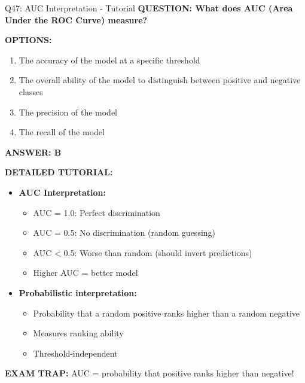 \documentclass[8pt]{beamer}
\begin{document}
	\begin{frame}{Q47: AUC Interpretation - Tutorial}
		\fontsize{6.5}{7.5}\selectfont
		\textbf{QUESTION: What does AUC (Area Under the ROC Curve) measure?}
		
		\vspace{0.1cm}
		\textbf{OPTIONS:}
		\begin{enumerate}
			\item The accuracy of the model at a specific threshold
			\item The overall ability of the model to distinguish between positive and negative classes
			\item The precision of the model
			\item The recall of the model
		\end{enumerate}
		
		\vspace{0.1cm}
		\textcolor{myblue}{\textbf{ANSWER: B}}
		
		\vspace{0.1cm}
		\textbf{DETAILED TUTORIAL:}
		\begin{itemize}
			\item \textbf{AUC Interpretation:}
			\begin{itemize}
				\item AUC = 1.0: Perfect discrimination
				\item AUC = 0.5: No discrimination (random guessing)
				\item AUC < 0.5: Worse than random (should invert predictions)
				\item Higher AUC = better model
			\end{itemize}
			\item \textbf{Probabilistic interpretation:}
			\begin{itemize}
				\item Probability that a random positive ranks higher than a random negative
				\item Measures ranking ability
				\item Threshold-independent
			\end{itemize}
		\end{itemize}
		
		\textcolor{myred}{\textbf{EXAM TRAP:}} AUC = \textcolor{myblue}{probability that positive ranks higher than negative}!
	\end{frame}
	
\end{document}
